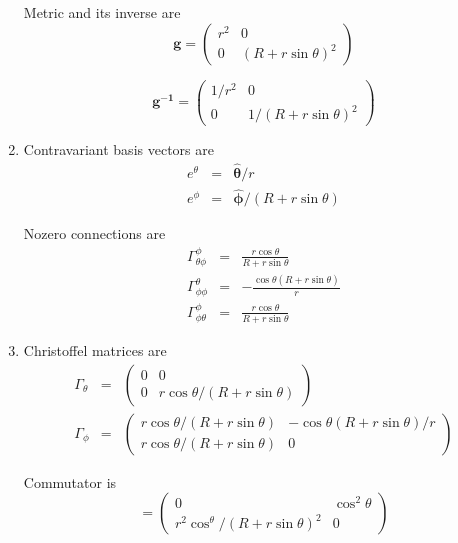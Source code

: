 \documentclass[12pt,a4paper]{article}
\begin{document}
\begin{enumerate}
Metric and its inverse are
\begin{equation*}
\bm g=\begin{pmatrix}
	r^2 & 0 \\
	0 & (R+r\sin\theta)^2 
	\end{pmatrix}
\end{equation*}

\begin{equation*}
	\bm {g^{-1}} = 
	\begin{pmatrix}
	1/r^2 & 0 \\
	0 & 1/(R+r\sin\theta)^2
	\end{pmatrix}
\end{equation*}




\item


Contravariant basis vectors are
\begin{eqnarray*}
	e^\theta &=& \bm{\hat \theta}/r \\
	e^\phi &=& \bm{\hat \phi}/(R+r\sin\theta)
\end{eqnarray*}


Nozero connections are
\begin{eqnarray*}
	\Gamma ^{\phi}_{\theta\phi} &=& \frac{r\cos\theta}{R+r\sin\theta} \\
	\Gamma^\theta_{\phi\phi}&=& - \frac{\cos\theta(R+r\sin\theta)}{r} \\
	\Gamma^\phi _{\phi\theta} &=& \frac{r\cos\theta}{R+r\sin\theta}
\end{eqnarray*}



\item

Christoffel matrices are
\begin{eqnarray*}
	\Gamma_\theta &=& \begin{pmatrix}
	0 & 0 \\
	0 & r\cos\theta/(R+r\sin\theta)
	\end{pmatrix} \\
	\Gamma_\phi &=& \begin{pmatrix}
	r\cos\theta/(R+r\sin\theta) & -\cos\theta(R+r\sin\theta)/r \\
	r\cos\theta/(R+r\sin\theta) & 0
	\end{pmatrix}
\end{eqnarray*}

Commutator is
\begin{equation*}
	[\Gamma_\theta,\Gamma_\phi] = \begin{pmatrix}
	0 & \cos^2\theta \\
	r^2\cos^\theta/(R+r\sin\theta)^2 & 0
	\end{pmatrix}
\end{equation*}


\end{enumerate}
\end{document}
